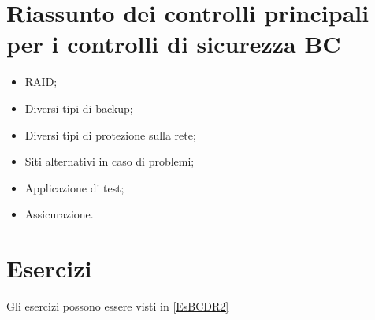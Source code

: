 \section{Riassunto dei controlli principali per i controlli di sicurezza BC}

\begin{itemize}
  \item RAID;
  \item Diversi tipi di backup;
  \item Diversi tipi di protezione sulla rete;
  \item Siti alternativi in caso di problemi;
  \item Applicazione di test;
  \item Assicurazione.
\end{itemize}

\section{Esercizi}

Gli esercizi possono essere visti in \ref{EsBCDR2}
